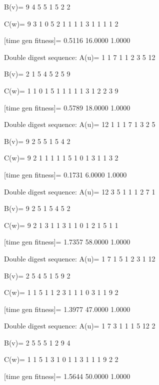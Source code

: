 B(v)=
     9     4     5     5     1     5     2     2

C(w)=
     9     3     1     0     5     2     1     1     1     1     3     1     1     1     1     2

[time gen fitness]=
    0.5116   16.0000    1.0000

Double digest sequence:
A(u)=
     1     1     7     1     1     2     3     5    12

B(v)=
     2     1     5     4     5     2     5     9

C(w)=
     1     1     0     1     5     1     1     1     1     1     3     1     2     2     3     9

[time gen fitness]=
    0.5789   18.0000    1.0000

Double digest sequence:
A(u)=
    12     1     1     1     7     1     3     2     5

B(v)=
     9     2     5     5     1     5     4     2

C(w)=
     9     2     1     1     1     1     1     5     1     0     1     3     1     1     3     2

[time gen fitness]=
    0.1731    6.0000    1.0000

Double digest sequence:
A(u)=
    12     3     5     1     1     1     2     7     1

B(v)=
     9     2     5     1     5     4     5     2

C(w)=
     9     2     1     3     1     1     3     1     1     0     1     2     1     5     1     1

[time gen fitness]=
    1.7357   58.0000    1.0000

Double digest sequence:
A(u)=
     1     7     1     5     1     2     3     1    12

B(v)=
     2     5     4     5     1     5     9     2

C(w)=
     1     1     5     1     1     2     3     1     1     1     0     3     1     1     9     2

[time gen fitness]=
    1.3977   47.0000    1.0000

Double digest sequence:
A(u)=
     1     7     3     1     1     1     5    12     2

B(v)=
     2     5     5     5     1     2     9     4

C(w)=
     1     1     5     1     3     1     0     1     1     3     1     1     1     9     2     2

[time gen fitness]=
    1.5644   50.0000    1.0000

